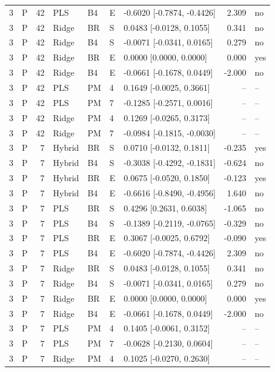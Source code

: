 \documentclass[10pt,a4paper]{article}
\begin{document}
\begin{landscape}
\begin{longtable}{rlrllllrl}
3 & P & 42 & PLS & B4 & E & -0.6020 [-0.7874, -0.4426] & 2.309 & no \\
3 & P & 42 & Ridge & BR & S & 0.0483 [-0.0128, 0.1055] & 0.341 & no \\
3 & P & 42 & Ridge & B4 & S & -0.0071 [-0.0341, 0.0165] & 0.279 & no \\
3 & P & 42 & Ridge & BR & E & 0.0000 [0.0000, 0.0000] & 0.000 & yes \\
3 & P & 42 & Ridge & B4 & E & -0.0661 [-0.1678, 0.0449] & -2.000 & no \\
3 & P & 42 & PLS & PM & 4 & 0.1649 [-0.0025, 0.3661] & -- & -- \\
3 & P & 42 & PLS & PM & 7 & -0.1285 [-0.2571, 0.0016] & -- & -- \\
3 & P & 42 & Ridge & PM & 4 & 0.1269 [-0.0265, 0.3173] & -- & -- \\
3 & P & 42 & Ridge & PM & 7 & -0.0984 [-0.1815, -0.0030] & -- & -- \\
3 & P & 7 & Hybrid & BR & S & 0.0710 [-0.0132, 0.1811] & -0.235 & yes \\
3 & P & 7 & Hybrid & B4 & S & -0.3038 [-0.4292, -0.1831] & -0.624 & no \\
3 & P & 7 & Hybrid & BR & E & 0.0675 [-0.0520, 0.1850] & -0.123 & yes \\
3 & P & 7 & Hybrid & B4 & E & -0.6616 [-0.8490, -0.4956] & 1.640 & no \\
3 & P & 7 & PLS & BR & S & 0.4296 [0.2631, 0.6038] & -1.065 & no \\
3 & P & 7 & PLS & B4 & S & -0.1389 [-0.2119, -0.0765] & -0.329 & no \\
3 & P & 7 & PLS & BR & E & 0.3067 [-0.0025, 0.6792] & -0.090 & yes \\
3 & P & 7 & PLS & B4 & E & -0.6020 [-0.7874, -0.4426] & 2.309 & no \\
3 & P & 7 & Ridge & BR & S & 0.0483 [-0.0128, 0.1055] & 0.341 & no \\
3 & P & 7 & Ridge & B4 & S & -0.0071 [-0.0341, 0.0165] & 0.279 & no \\
3 & P & 7 & Ridge & BR & E & 0.0000 [0.0000, 0.0000] & 0.000 & yes \\
3 & P & 7 & Ridge & B4 & E & -0.0661 [-0.1678, 0.0449] & -2.000 & no \\
3 & P & 7 & PLS & PM & 4 & 0.1405 [-0.0061, 0.3152] & -- & -- \\
3 & P & 7 & PLS & PM & 7 & -0.0628 [-0.2130, 0.0604] & -- & -- \\
3 & P & 7 & Ridge & PM & 4 & 0.1025 [-0.0270, 0.2630] & -- & -- \\

\end{longtable}
\end{landscape}
\end{document}

